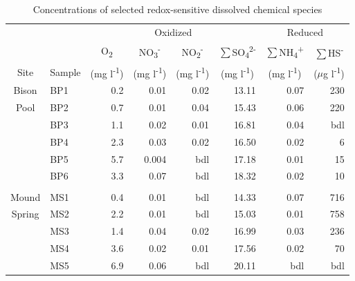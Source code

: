 \singlespace
\begin{table}[htbp]
  \begin{adjustbox}{width=\textwidth,keepaspectratio}
  \begin{threeparttable}
  \caption{Concentrations of selected redox-sensitive dissolved chemical species}


\begin{tabular}{clrrrrrr}
\toprule
      &       & \multicolumn{4}{c}{Oxidized}  & \multicolumn{2}{c}{Reduced} \\
\cmidrule(l{2pt}r{2pt}){3-6} \cmidrule(l{2pt}r{2pt}){7-8}      &       & \multicolumn{1}{c}{O\textsubscript{2}} & \multicolumn{1}{c}{NO\textsubscript{3}\textsuperscript{-}} & \multicolumn{1}{c}{NO\textsubscript{2}\textsuperscript{-}} & \multicolumn{1}{c}{$\sum$SO\textsubscript{4}\textsuperscript{2-}} & \multicolumn{1}{c}{$\sum$NH\textsubscript{4}\textsuperscript{+}} & \multicolumn{1}{c}{$\sum$HS\textsuperscript{-}} \\
Site  & Sample & \multicolumn{1}{c}{(mg l\textsuperscript{-1})} & \multicolumn{1}{c}{(mg l\textsuperscript{-1})} & \multicolumn{1}{c}{(mg l\textsuperscript{-1})} & \multicolumn{1}{c}{(mg l\textsuperscript{-1})} & \multicolumn{1}{c}{(mg l\textsuperscript{-1})} & \multicolumn{1}{c}{($\mu$g l\textsuperscript{-1})} \\
\midrule
Bison & BP1   & 0.2   & 0.01  & 0.02  & 13.11 & 0.07  & 230 \\
Pool  & BP2   & 0.7   & 0.01  & 0.04  & 15.43 & 0.06  & 220 \\
      & BP3   & 1.1   & 0.02  & 0.01  & 16.81 & 0.04  & bdl \\
      & BP4   & 2.3   & 0.03  & 0.02  & 16.50 & 0.02  & 6 \\
      & BP5   & 5.7   & 0.004 & bdl   & 17.18 & 0.01  & 15 \\
      & BP6   & 3.3   & 0.07  & bdl   & 18.32 & 0.02  & 10 \\
      &       &       &       &       &       &       &  \\
Mound & MS1   & 0.4   & 0.01  & bdl   & 14.33 & 0.07  & 716 \\
Spring & MS2   & 2.2   & 0.01  & bdl   & 15.03 & 0.01  & 758 \\
      & MS3   & 1.4   & 0.04  & 0.02  & 16.99 & 0.03  & 236 \\
      & MS4   & 3.6   & 0.02  & 0.01  & 17.56 & 0.02  & 70 \\
      & MS5   & 6.9   & 0.06  & bdl   & 20.11 & bdl   & bdl \\

\end{tabular}
\end{threeparttable}
\end{adjustbox}
\end{table}
